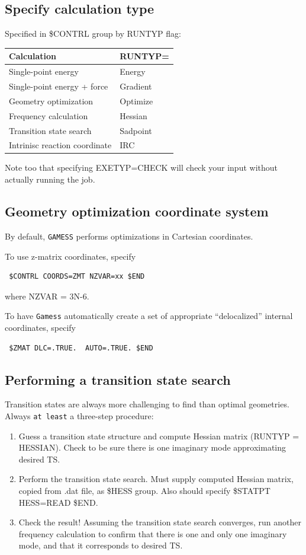 \documentclass[11pt]{article}
\begin{document}
\subsection{Specify calculation type}
\label{sec:org26cdad0}
Specified in \$CONTRL group by RUNTYP flag:

\begin{center}
\begin{tabular}{ll}
Calculation & RUNTYP=\\
\hline
Single-point energy & Energy\\
Single-point energy + force & Gradient\\
Geometry optimization & Optimize\\
Frequency calculation & Hessian\\
Transition state search & Sadpoint\\
Intrinisc reaction coordinate & IRC\\
\end{tabular}
\end{center}

Note too that specifying EXETYP=CHECK will check your input without actually running the job.
\subsection{Geometry optimization coordinate system}
\label{sec:org126738c}
By default, \texttt{GAMESS} performs optimizations in Cartesian coordinates.

To use z-matrix coordinates, specify
\begin{verbatim}
 $CONTRL COORDS=ZMT NZVAR=xx $END
\end{verbatim}
where NZVAR = 3N-6.

To have \texttt{Gamess} automatically create a set of appropriate ``delocalized'' internal coordinates, specify
\begin{verbatim}
 $ZMAT DLC=.TRUE.  AUTO=.TRUE. $END
\end{verbatim}
\subsection{Performing a transition state search}
\label{sec:org1e578d8}
Transition states are always more challenging to find than optimal geometries.  Always \texttt{at least} a three-step procedure:

\begin{enumerate}
\item Guess a transition state structure and compute Hessian matrix (RUNTYP = HESSIAN).  Check to be sure there is one imaginary mode approximating desired TS.
\item Perform the transition state search.  Must supply computed Hessian matrix, copied from .dat file, as \$HESS group.  Also should specify \$STATPT HESS=READ \$END.
\item Check the result!  Assuming the transition state search converges, run another frequency calculation to confirm that there is one and only one imaginary mode, and that it corresponds to desired TS.
\end{enumerate}
\end{document}
